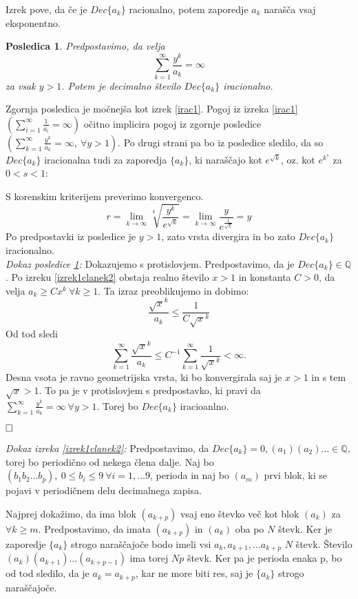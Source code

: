 \documentclass[a4paper,12pt]{article}
\def\Q{\mathbb{Q}} %
\def\qed{$\hfill\Box$}   %
\newtheorem{posledica}{Posledica}
\begin{document}
Izrek pove, da če je $Dec\{a_k\}$ racionalno, potem zaporedje $a_k$ narašča vsaj eksponentno.

\begin{posledica}
    \label{posledica}
    Predpostavimo, da velja
    \[
        \sum_{k=1}^{\infty}\frac{y^k}{a_k} = \infty\]
    za vsak $y > 1$. Potem je decimalno število $Dec\{a_k\}$ iracionalno.
\end{posledica}

Zgornja posledica je močnejša kot izrek \ref{irac1}. Pogoj iz izreka \ref{irac1} 
$(\sum_{i=1}^{\infty} \frac{1}{a_i} = \infty)$ očitno implicira
pogoj iz zgornje posledice $(\sum_{k=1}^{\infty}\frac{y^k}{a_k} = \infty , \ \forall y > 1)$.
Po drugi strani pa bo iz posledice sledilo, da so $Dec\{a_k\}$ iracionalna tudi za zaporedja
$\{a_k\}$, ki naraščajo kot $e^{\sqrt{k}}$, oz. kot $e^{k^s}$ za $0 < s < 1$:

S korenskim kriterijem preverimo konvergenco.
\[
    r = \lim_{k \rightarrow \infty}\sqrt[k]{\frac{y^k}{e^{\sqrt{k}}}} = \lim_{k \rightarrow \infty}\frac{y}{e^{\frac{1}{\sqrt{k}}}}
    = y
\]
Po predpostavki iz posledice je $y > 1$, zato vrsta divergira in bo zato $Dec\{a_k\}$ iracionalno.
\\

\noindent
{\em Dokaz posledice \ref{posledica}:\/}
Dokazujemo s protislovjem. Predpostavimo, da je $Dec\{a_k\} \in \Q$.
Po izreku \ref{izrek1clanek2} obstaja realno število $x > 1$ in konstanta $C>0$, da velja
$a_k \geq Cx^k \ \forall k \geq 1$. Ta izraz preoblikujemo in dobimo:
\[
    \frac{\sqrt{x}^k}{a_k} \leq \frac{1}{C\sqrt{x}^k}\] 
Od tod sledi
\[ \sum_{k=1}^{\infty} \frac{\sqrt{x}^k}{a_k} \leq C^{-1} \sum_{k=1}^{\infty} \frac{1}{\sqrt{x}^k} < \infty.\]
Desna vsota je ravno geometrijska vrsta, ki bo konvergirala saj je $x > 1$ in s tem $\sqrt{x} > 1$.
To pa je v protislovjem s predpostavko, ki pravi da $\sum_{k=1}^{\infty}\frac{y^k}{a_k} = \infty \ \forall y>1$.
Torej bo $Dec\{a_k\}$ iracioanlno.

\qed

{\em Dokaz izreka \ref{izrek1clanek2}:\/} Predpostavimo, da $Dec\{a_k\} = 0,(a_1)(a_2)\dots \in \Q$, torej bo 
periodično od nekega člena dalje. Naj bo
$(b_1b_2 \dots b_p), \ 0 \leq b_i \leq 9 \ \forall i = 1, \dots 9$, perioda in naj bo
$(a_m)$ prvi blok, ki se pojavi v periodičnem delu decimalnega zapisa.

Najprej dokažimo, da ima blok $(a_{k+p})$ vsaj eno števko več kot blok $(a_k)$ za $\forall k \geq m$.
Predpostavimo, da imata $(a_{k+p})$ in $(a_k)$ oba po $N$ števk. 
Ker je zaporedje $\{a_k\}$ strogo naraščajoče bodo imeli vsi $a_k, a_{k+1}, \dots a_{k+p}$ $N$ števk.
Število $(a_k)(a_{k+1})\dots (a_{k+p-1})$ ima torej $Np$ števk. Ker pa je perioda enaka p,
bo od tod sledilo, da je $a_k = a_{k+p}$, kar ne more biti res, saj je $\{a_k\}$ strogo naraščajoče.
\end{document}
